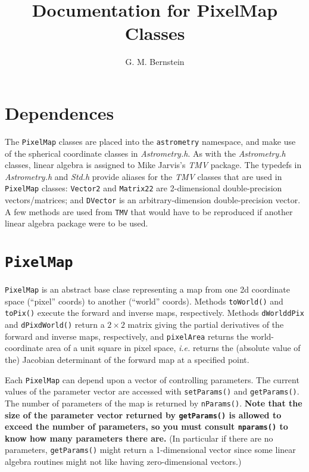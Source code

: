 \documentclass[11pt,preprint,flushrt]{aastex}
\begin{document}

\title{Documentation for PixelMap Classes}

\author{G. M. Bernstein}

\section{Dependences}
The {\tt PixelMap} classes are placed into the {\tt astrometry} namespace, and make use of the spherical coordinate classes in {\it Astrometry.h}.  As with the {\it Astrometry.h} classes, linear algebra is assigned to Mike Jarvis's {\it TMV} package.  The typedefs in {\it Astrometry.h} and {\it Std.h} provide aliases for the {\it TMV} classes that are used in {\tt PixelMap} classes:  {\tt Vector2} and {\tt Matrix22} are 2-dimensional double-precision vectors/matrices; and {\tt DVector} is an arbitrary-dimension double-precision vector.  A few methods are used from {\tt TMV} that would have to be reproduced if another linear algebra package were to be used.

\section{{\tt PixelMap}}
{\tt PixelMap} is an abstract base clase representing a map from one
2d coordinate space (``pixel'' coords) to another (``world'' coords).
Methods {\tt toWorld()} and {\tt toPix()} execute the forward and inverse maps, respectively.  Methods {\tt  dWorlddPix}  and {\tt dPixdWorld()} return a $2\times2$ matrix giving the partial derivatives of the forward and inverse maps, respectively, and {\tt pixelArea} returns the world-coordinate area of a unit square in pixel space, {\it i.e.} returns the (absolute value of the) Jacobian determinant of the forward map at a specified point.

Each {\tt PixelMap} can depend upon a vector of controlling parameters.  The current values of the parameter vector are accessed with {\tt setParams()} and {\tt getParams()}.  The number of parameters of the map is returned by {\tt nParams()}.  {\bf Note that the size of the parameter vector returned by {\tt getParams()} is allowed to exceed the number of parameters, so you must consult {\tt nparams()} to know how many parameters there are.}  (In particular if there are no parameters, {\tt getParams()} might return a 1-dimensional vector since some linear algebra routines might not like having zero-dimensional vectors.)
\end{document}
